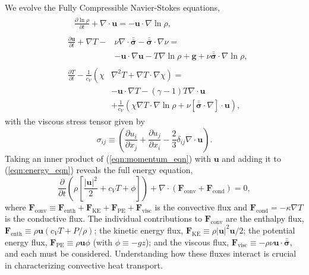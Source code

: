 \documentclass[aps, prl, twocolumn, nofootinbib, groupedaddress, amsfonts, amssymb, amsmath]{revtex4-1}
\newcommand{\Div}[1]{\ensuremath{\nabla\cdot\left( #1\right)}}
\newcommand{\grad}{\ensuremath{\nabla}}
\newcommand{\lilstressT}{\ensuremath{\bm{\bar{\bar{\sigma}}}}}
\begin{document}
We evolve the Fully Compressible Navier-Stokes equations,
\begin{align}
&\begin{aligned}
&\frac{\partial \ln\rho}{\partial t} + \grad\cdot\bm{u} 
    = -\bm{u}\cdot\grad\ln\rho,
	\label{eqn:continuity_eqn}
\end{aligned}\\
&\begin{aligned}
\frac{\partial\bm{u}}{\partial t} + \grad T - 
&\nu\grad\cdot\lilstressT - \lilstressT\cdot\grad\nu = \\
&-\bm{u}\cdot\grad\bm{u} - T\grad\ln\rho + \bm{g} + 
\nu\lilstressT\cdot\grad\ln\rho,
\label{eqn:momentum_eqn}
\end{aligned}\\
&\begin{aligned}
\frac{\partial T}{\partial t} -\frac{1}{c_V}\left(\right.\chi&\left.
    \grad^2 T + \grad T\cdot\grad\chi\right) = \\
	&-\bm{u}\cdot\grad T - (\gamma-1)T\grad\cdot{\bm{u}} \\
	&+ \frac{1}{c_V}\left(\chi\grad T \cdot\grad\ln\rho +
	\nu\left[\lilstressT\cdot\nabla\right]\cdot\bm{u}\right), 
	\label{eqn:energy_eqn}
\end{aligned}
\end{align}
with the viscous stress tensor given by
\begin{equation}
\sigma_{ij} \equiv \left(\frac{\partial u_i}{\partial x_j} + 
\frac{\partial u_j}{\partial x_i} - \frac{2}{3}\delta_{ij}\grad\cdot\bm{u}\right).
	\label{eqn:stress_tensor}
\end{equation}
Taking an inner product of
(\ref{eqn:momentum_eqn}) with $\bm{u}$ and adding it to 
(\ref{eqn:energy_eqn}) reveals the full energy equation,
\begin{equation}
\frac{\partial}{\partial t}\left(\rho\left[\frac{|\bm{u}|^2}{2} + c_V T + \phi\right]\right) +
\Div{\bm{F}_{\text{conv}} + \bm{F}_{\text{cond}}} = 0,
	\label{eqn:energy_eqn_full}
\end{equation}
where
$
\bm{F}_{\text{conv}} \equiv \bm{F}_{\text{enth}} + \bm{F}_{\text{KE}} + \bm{F}_{\text{PE}} + \bm{F}_{\text{visc}}
$
is the convective flux and $\bm{F}_{\text{cond}} = -\kappa \grad T$
is the conductive flux.
The individual contributions to $\bm{F}_{\text{conv}}$ are the enthalpy flux, 
$\bm{F}_{\text{enth}} \equiv \rho\bm{u}(c_V T + P/\rho)$;
the kinetic energy flux, 
$\bm{F}_{\text{KE}} \equiv \rho|\bm{u}|^2\bm{u}/2$;
the potential energy flux,
$\bm{F}_{\text{PE}} \equiv \rho\bm{u}\phi$ (with $\phi \equiv -gz$);
and the viscous flux, 
$\bm{F}_{\text{visc}} \equiv -\rho\nu\bm{u}\cdot\lilstressT$, and each 
must be considered. 
Understanding how these fluxes interact  
is crucial in characterizing convective heat transport.
\end{document}
